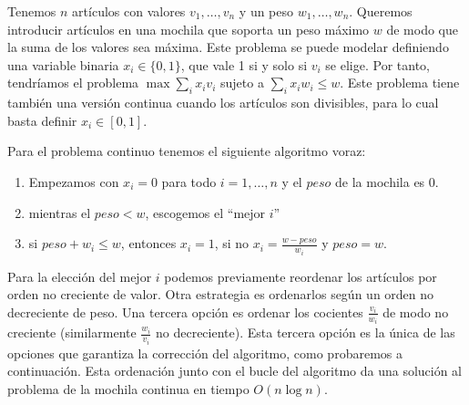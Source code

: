 \documentclass[AL.tex]{subfiles}
\begin{document}
\begin{ej}
Tenemos $n$ artículos con valores $v_1,\dots, v_n$ y un peso $w_1,\dots, w_n$. Queremos introducir artículos en una mochila que soporta un peso máximo $w$ de modo que la suma de los valores sea máxima. Este problema se puede modelar definiendo una variable binaria $x_i\in\{0,1\}$, que vale 1 si y solo si $v_i$ se elige. Por tanto, tendríamos el problema $\max\sum_i x_iv_i$ sujeto a $\sum_ix_iw_i\leq w$. Este problema tiene también una versión continua cuando los artículos son divisibles, para lo cual basta definir $x_i\in[0,1]$. 

Para el problema continuo tenemos el siguiente algoritmo voraz:
\begin{enumerate}
\item Empezamos con $x_i=0$ para todo $i=1,\dots, n$ y el $peso$ de la mochila es 0. 
\item mientras el $peso<w$, escogemos el ``mejor $i$''
\item si $peso+w_i\leq w$, entonces $x_i=1$, si no $x_i=\frac{w-peso}{w_i}$ y $peso=w$.
\end{enumerate}

Para la elección del mejor $i$ podemos previamente reordenar los artículos por orden no creciente de valor. Otra estrategia es ordenarlos según un orden no decreciente de peso. Una tercera opción es ordenar los cocientes $\frac{v_i}{w_i}$ de modo no creciente (similarmente $\frac{w_i}{v_i}$ no decreciente). Esta tercera opción es la única de las opciones que garantiza la corrección del algoritmo, como probaremos a continuación. Esta ordenación junto con el bucle del algoritmo da una solución al problema de la mochila continua en tiempo $O(n\log n)$. 

\end{ej}
\end{document}
